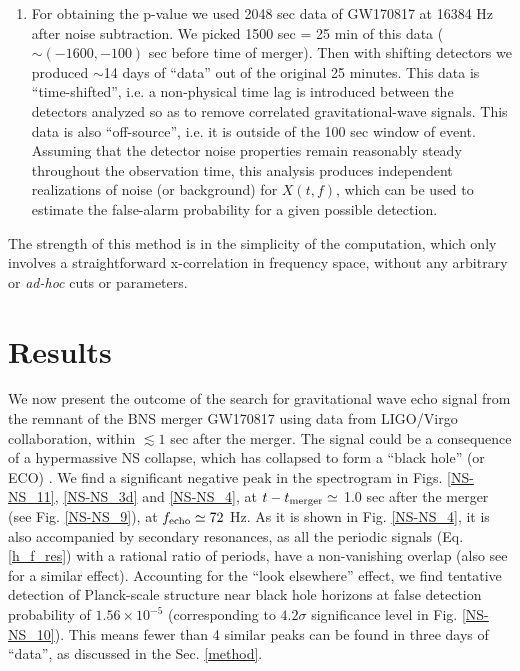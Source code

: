 \documentclass[a4paper,11pt]{article}
\begin{document}
\begin{enumerate}
\item For obtaining the p-value we used 2048 sec data of GW170817 at 16384 Hz after noise subtraction. We picked 1500 sec = 25 min of this data ($\sim (-1600,-100)$ sec before time of merger). Then with shifting detectors we produced $\sim$14 days of ``data'' out of the original 25 minutes. This data is ``time-shifted'', i.e. a non-physical time lag is introduced between the detectors analyzed so as to remove correlated gravitational-wave signals. This data is also ``off-source'', i.e. it is outside of the 100 sec window of event. Assuming that the detector noise properties remain reasonably steady throughout the observation time, this analysis produces independent realizations of noise (or background) for $X(t,f)$, which can be used to estimate the false-alarm probability for a given possible detection.

\end{enumerate}


The strength of this method is in the simplicity of the computation, which only involves a straightforward x-correlation in frequency space,  without any arbitrary or {\it ad-hoc} cuts or parameters.


\section{\label{Results}Results}

We now present the outcome of the search for gravitational wave echo signal from the remnant of the BNS merger GW170817 using data from LIGO/Virgo collaboration, within  $\lesssim 1$ sec after the merger. The signal could be a consequence of a hypermassive NS collapse, which has collapsed to form a ``black hole'' (or ECO) \cite{Abbott:2017dke}.
We find a significant negative peak in the spectrogram in Figs. \ref{NS-NS_11}, \ref{NS-NS_3d} and \ref{NS-NS_4}, at $t-t_{\rm{merger}} \simeq $ 1.0 sec after the merger (see Fig. \ref{NS-NS_9}), at $f_{\rm echo} \simeq 72$ Hz. As it is shown in Fig. \ref{NS-NS_4}, it is also accompanied by secondary resonances, as all the periodic signals (Eq. \ref{h_f_res}) with a rational ratio of periods, have a non-vanishing overlap (also see \cite{Conklin:2017lwb} for a similar effect). Accounting for the ``look elsewhere'' effect, we find tentative detection of Planck-scale structure near black hole horizons at false detection probability of $1.56\times 10^{-5}$ (corresponding to $4.2\sigma$ significance level in Fig. \ref{NS-NS_10}). This means fewer than 4 similar peaks can be found in three days of ``data'', as discussed in the Sec. \ref{method}. 
\end{document}
